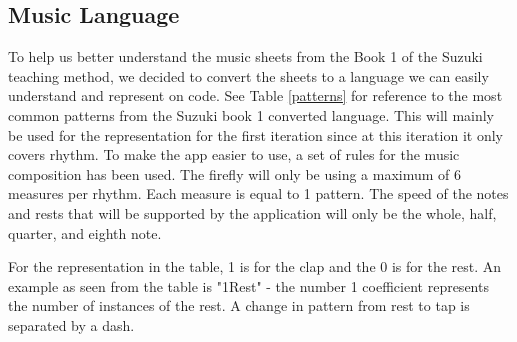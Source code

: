 
\subsection{Music Language}
To help us better understand the music sheets from the Book 1 of the Suzuki teaching method, we decided to convert the sheets to a language we can easily understand and represent on code. See Table \ref{patterns} for reference to the most common patterns from the Suzuki book 1 converted language. This will mainly be used for the representation for the first iteration since at this iteration it only covers rhythm. To make the app easier to use, a set of rules for the music composition has been used. The firefly will only be using a maximum of 6 measures per rhythm. Each measure is equal to 1 pattern. The speed of the notes and rests that will be supported by the application will only be the whole, half, quarter, and eighth note.

For the representation in the table, 1 is for the clap and the 0 is for the rest. An example as seen from the table is "1Rest" - the number 1 coefficient represents the number of instances of the rest. A change in pattern from rest to tap is separated by a dash. 

